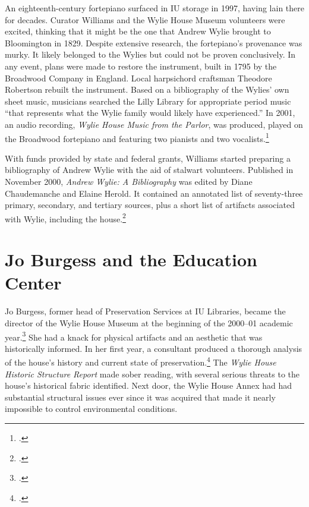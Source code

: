 \documentclass[
  american,
  letterpaper,
]{scrreprt}
\begin{document}
An eighteenth-century fortepiano surfaced in IU storage in 1997, having
lain there for decades. Curator Williams and the Wylie House Museum
volunteers were excited, thinking that it might be the one that Andrew
Wylie brought to Bloomington in 1829. Despite extensive research, the
fortepiano's provenance was murky. It likely belonged to the Wylies but
could not be proven conclusively. In any event, plans were made to
restore the instrument, built in 1795 by the Broadwood Company in
England. Local harpsichord craftsman Theodore Robertson rebuilt the
instrument. Based on a bibliography of the Wylies' own sheet music,
musicians searched the Lilly Library for appropriate period music ``that
represents what the Wylie family would likely have experienced.'' In
2001, an audio recording, \emph{Wylie House Music from the Parlor}, was
produced, played on the Broadwood fortepiano and featuring two pianists
and two vocalists.\footnote{.}

With funds provided by state and federal grants, Williams started
preparing a bibliography of Andrew Wylie with the aid of stalwart
volunteers. Published in November 2000, \emph{Andrew Wylie: A
Bibliography} was edited by Diane Chaudemanche and Elaine Herold. It
contained an annotated list of seventy-three primary, secondary, and
tertiary sources, plus a short list of artifacts associated with Wylie,
including the house.\footnote{.}

\section{Jo Burgess and the Education
Center}\label{jo-burgess-and-the-education-center}

Jo Burgess, former head of Preservation Services at IU Libraries, became
the director of the Wylie House Museum at the beginning of the 2000--01
academic year.\footnote{.}
She had a knack for physical artifacts and an aesthetic that was
historically informed. In her first year, a consultant produced a
thorough analysis of the house's history and current state of
preservation.\footnote{.} The
\emph{Wylie House Historic Structure Report} made sober reading, with
several serious threats to the house's historical fabric identified.
Next door, the Wylie House Annex had had substantial structural issues
ever since it was acquired that made it nearly impossible to control
environmental conditions.
\end{document}
